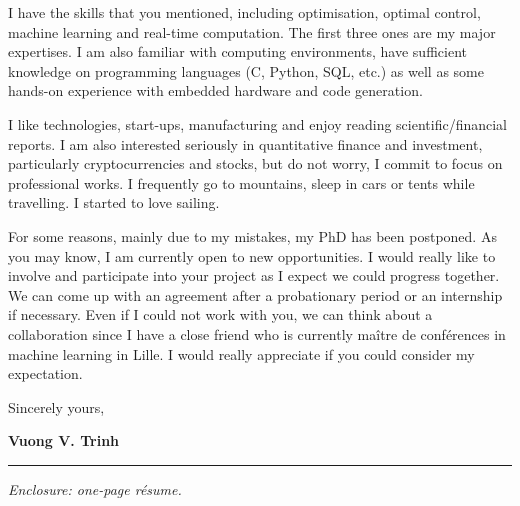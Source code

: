 \documentclass[a4paper,11pt]{article}
\begin{document}
{\begin{minipage}[t]{\textwidth+\marginparwidth+\marginparsep}
\vspace{0.3cm}

I have the skills that you mentioned, including optimisation, optimal control, machine learning and real-time computation. The first three ones are my major expertises. I am also familiar with computing environments, have sufficient knowledge on programming languages (C, Python, SQL, etc.) as well as some hands-on experience with embedded hardware and code generation. 

\vspace{0.3cm}

I like technologies, start-ups, manufacturing and enjoy reading scientific/financial reports. I am also interested seriously in quantitative finance and investment, particularly cryptocurrencies and stocks, but do not worry, I commit to focus on professional works. I frequently go to mountains, sleep in cars or tents while travelling. I started to love sailing.

\vspace{0.3cm}

For some reasons, mainly due to my mistakes, my PhD has been postponed. As you may know, I am currently open to new opportunities. I would really like to involve and participate into your project as I expect we could progress together. We can come up with an agreement after a probationary period or an internship if necessary. Even if I could not work with you, we can think about a collaboration since I have a close friend who is currently ma\^{i}tre de conf\'{e}rences in machine learning in Lille. I would really appreciate if you could consider my expectation.

\vspace{0.3cm}

Sincerely yours,

\vspace{0.3cm}

\textbf{Vuong V. Trinh}

\vspace{0.8cm}

\rule{\columnwidth}{1pt}

\emph{
Enclosure: one-page r\'esume.
}

\end{minipage}}
\end{document}
